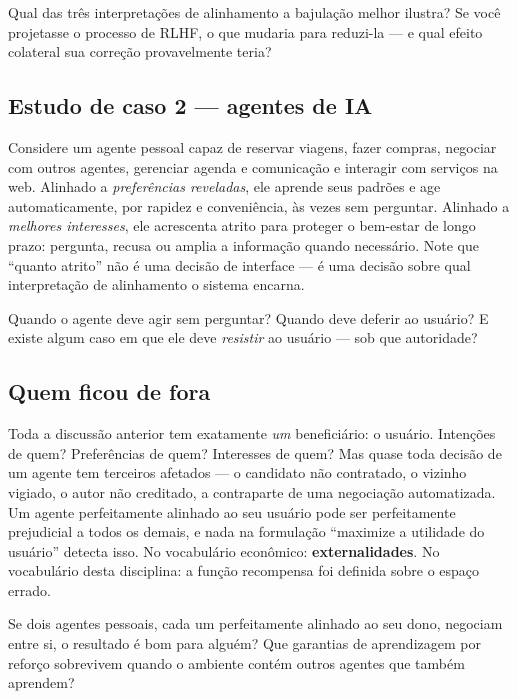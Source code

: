 \documentclass[11pt]{article}
\begin{document}
\begin{discbox}
Qual das três interpretações de alinhamento a bajulação melhor ilustra? Se você
projetasse o processo de RLHF, o que mudaria para reduzi-la --- e qual efeito
colateral sua correção provavelmente teria?
\end{discbox}

\subsection*{Estudo de caso 2 --- agentes de IA}

Considere um agente pessoal capaz de reservar viagens, fazer compras, negociar
com outros agentes, gerenciar agenda e comunicação e interagir com serviços na
web. Alinhado a \emph{preferências reveladas}, ele aprende seus padrões e age
automaticamente, por rapidez e conveniência, às vezes sem perguntar. Alinhado a
\emph{melhores interesses}, ele acrescenta atrito para proteger o bem-estar de
longo prazo: pergunta, recusa ou amplia a informação quando necessário. Note que
``quanto atrito'' não é uma decisão de interface --- é uma decisão sobre qual
interpretação de alinhamento o sistema encarna.

\begin{discbox}
Quando o agente deve agir sem perguntar? Quando deve deferir ao usuário? E
existe algum caso em que ele deve \emph{resistir} ao usuário --- sob que
autoridade?
\end{discbox}

\subsection*{Quem ficou de fora}

Toda a discussão anterior tem exatamente \emph{um} beneficiário: o usuário.
Intenções de quem? Preferências de quem? Interesses de quem? Mas quase toda
decisão de um agente tem terceiros afetados --- o candidato não contratado, o
vizinho vigiado, o autor não creditado, a contraparte de uma negociação
automatizada. Um agente perfeitamente alinhado ao seu usuário pode ser
perfeitamente prejudicial a todos os demais, e nada na formulação ``maximize a
utilidade do usuário'' detecta isso. No vocabulário econômico:
\textbf{externalidades}. No vocabulário desta disciplina: a função recompensa
foi definida sobre o espaço errado.

\begin{discbox}
Se dois agentes pessoais, cada um perfeitamente alinhado ao seu dono, negociam
entre si, o resultado é bom para alguém? Que garantias de aprendizagem por
reforço sobrevivem quando o ambiente contém outros agentes que também aprendem?
\end{discbox}
\end{document}
